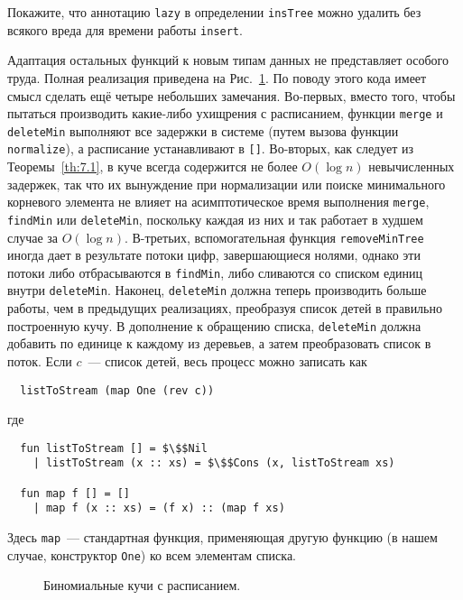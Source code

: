 \begin{exercise}\label{ex:7.3}
  Покажите, что аннотацию \lstinline!lazy! в определении
  \lstinline!insTree! можно удалить без всякого вреда для времени
  работы \lstinline!insert!.
\end{exercise}

Адаптация остальных функций к новым типам данных не представляет
особого труда. Полная реализация приведена на
Рис.~\ref{fig:7.2}. По поводу этого кода имеет смысл сделать ещё
четыре небольших замечания. Во-первых, вместо того, чтобы пытаться
производить какие-либо ухищрения с расписанием, функции
\lstinline!merge! и \lstinline!deleteMin! выполняют все задержки в
системе (путем вызова функции \lstinline!normalize!), а расписание
устанавливают в \lstinline![]!. Во-вторых, как следует из
Теоремы~\ref{th:7.1}, в куче всегда содержится не более $O(\log n)$
невычисленных задержек, так что их вынуждение при нормализации или
поиске минимального корневого элемента не влияет на асимптотическое
время выполнения \lstinline!merge!, \lstinline!findMin! или
\lstinline!deleteMin!, поскольку каждая из них и так работает в худшем
случае за $O(\log n)$. В-третьих, вспомогательная функция
\lstinline!removeMinTree! иногда дает в результате потоки цифр,
завершающиеся нолями, однако эти потоки либо отбрасываются в
\lstinline!findMin!, либо сливаются со списком единиц внутри
\lstinline!deleteMin!. Наконец, \lstinline!deleteMin! должна теперь
производить больше работы, чем в предыдущих реализациях, преобразуя
список детей в правильно построенную кучу. В дополнение к обращению
списка, \lstinline!deleteMin! должна добавить по единице к каждому из
деревьев, а затем преобразовать список в поток. Если $c$~--- список
детей, весь процесс можно записать как
\begin{lstlisting}
  listToStream (map One (rev c))
\end{lstlisting}
где
\begin{lstlisting}
  fun listToStream [] = $\$$Nil
    | listToStream (x :: xs) = $\$$Cons (x, listToStream xs)

  fun map f [] = []
    | map f (x :: xs) = (f x) :: (map f xs)
\end{lstlisting}
Здесь \lstinline!map!~--- стандартная функция, применяющая другую
функцию (в нашем случае, конструктор \lstinline!One!) ко всем
элементам списка.

\begin{figure}
  \centering

  \caption{Биномиальные кучи с расписанием.}
  \label{fig:7.2}
\end{figure}

